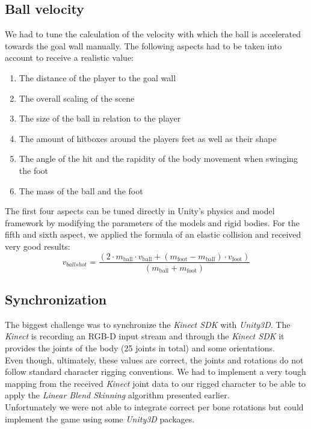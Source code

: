 \documentclass[a4paper,pagesize 10pt]{scrartcl}
\def\linearBlendSkinning{\textit{\linearBlendSkinningn}}
\def\linearBlendSkinningn{Linear Blend Skinning}
\def\kinectSDK{\textit{\kinect{} SDK}}
\def\kinect{\textit{Kinect}}
\begin{document}
  \subsection*{Ball velocity}
  We had to tune the calculation of the velocity with which the ball is accelerated towards the goal wall manually.
  The following aspects had to be taken into account to receive a realistic value:
  \begin{enumerate}
    \setlength{\itemsep}{0pt}
    \item The distance of the player to the goal wall
    \item The overall scaling of the scene
    \item The size of the ball in relation to the player
    \item The amount of hitboxes around the players feet as well as their shape
    \item The angle of the hit and the rapidity of the body movement when swinging the foot
    \item The mass of the ball and the foot
  \end{enumerate}
  The first four aspects can be tuned directly in Unity's physics and model framework by modifying the parameters of the models and rigid bodies.
  For the fifth and sixth aspect, we applied the formula of an elastic collision and received very good results:
  \begin{equation}
    v_{ballshot} = 
    \frac{(2 \cdot m_{\text{ball}} \cdot v_{\text{ball}} + (m_{\text{foot}} - m_{\text{ball}}) \cdot v_{\text{foot}})}{(m_{\text{ball}} + m_{\text{foot}})}
  \end{equation}
  \subsection*{Synchronization}
  The biggest challenge was to synchronize the \kinectSDK{} with \textit{Unity3D}.
  The \kinect{} is recording an RGB-D input stream and through the \kinectSDK{} it provides the joints of the body (25 joints in total) and some orientations.\\
  Even though, ultimately, these values are correct, the joints and rotations do not follow standard character rigging conventions.
  We had to implement a very tough mapping from the received \kinect{} joint data to our rigged character to be able to apply the \linearBlendSkinning{} algorithm presented earlier.\\
  Unfortunately we were not able to integrate correct per bone rotations but could implement the game using some \textit{Unity3D} packages.
\end{document}
